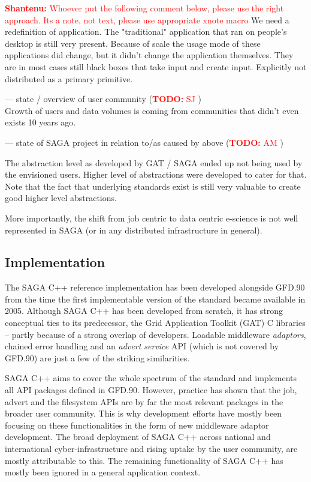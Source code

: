 \documentclass{article}
\newcommand{\B}[1]{\textbf{#1}}
\newcommand{\todo}[1]{{\textcolor{red}{\B{TODO:} #1 }}}
\newcommand{\jhanote}[1]{{\textcolor{red}{     \B{Shantenu:} #1 }}}
\newcommand{\jhanote}[1]{}
\begin{document}
\jhanote{Whoever put the following comment below, please use the right
  approach. Its a note, not text, please use appropriate xnote macro} We need a
redefinition of application. The "traditional" application that ran on
people's desktop is still very present.  Because of scale the usage
mode of these applications did change, but it didn't change the
application themselves.  They are in most cases still black boxes that
take input and create input.  Explicitly not distributed as a primary
primitive.

 --- state / overview of user community (\todo{SJ})\\
 
 Growth of users and data volumes is coming from communities that
 didn't even exists 10 years ago.
 
 
 --- state of SAGA project in relation to/as caused by above (\todo{AM})

 The abstraction level as developed by GAT / SAGA ended up not being
 used by the envisioned users.  Higher level of abstractions were
 developed to cater for that. Note that the fact that underlying
 standards exist is still very valuable to create good higher level
 abstractions.

 More importantly, the shift from job centric to data centric
 e-science is not well represented in SAGA (or in any distributed
 infrastructure in general).

\subsection{Implementation}

The SAGA C++ reference implementation has been developed alongside GFD.90 from the time 
the first implementable version of the standard became available in 2005. Although SAGA C++ 
has been developed from scratch, it has strong conceptual ties to its predecessor, the Grid 
Application Toolkit (GAT) C libraries -- partly because of a strong overlap of developers. 
Loadable middleware \textit{adaptors}, chained error handling and an \textit{advert service} 
API (which is not covered by GFD.90) are just a few of the striking similarities. 

SAGA C++ aims to cover the whole spectrum of the standard and implements all API 
packages defined in GFD.90. However, practice has shown that the job, advert and 
the filesystem APIs are by far the most relevant packages in the broader user community. 
This is why development efforts have mostly been focusing on these functionalities 
in the form of new middleware adaptor development. The broad deployment of SAGA 
C++ across national and international cyber-infrastructure and rising uptake by the 
user community, are mostly attributable to this. The remaining functionality of 
SAGA C++ has mostly been ignored in a general application context.
\end{document}
